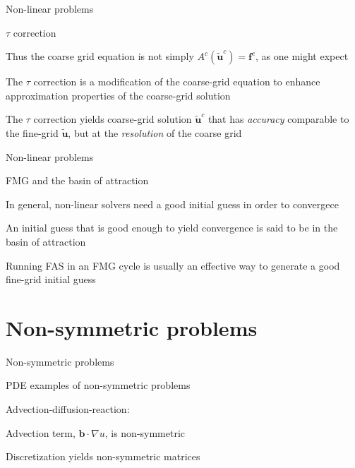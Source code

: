 \documentclass[18pt,xcolor=table]{beamer}
\begin{document}
\begin{frame}{Non-linear problems}
\begin{block}{$\tau$ correction}
\bit
\item Thus the coarse grid equation is not simply $A^c(\mathbf{\tilde{u}}^c) = \mathbf{f}^c$, as one might expect
\item The $\tau$ correction is a modification of the coarse-grid equation to enhance approximation properties of the coarse-grid solution
\item The $\tau$ correction yields coarse-grid solution $\mathbf{\tilde{u}}^c$ that has \emph{accuracy} comparable to the fine-grid $\mathbf{\tilde{u}}$, but at the \emph{resolution} of the coarse grid
\eit
\end{block}
\end{frame}

\begin{frame}{Non-linear problems}
\begin{block}{FMG and the basin of attraction}
\bit
\item In general, non-linear solvers need a good initial guess in order to convergece
\item An initial guess that is good enough to yield convergence is said to be in the basin of attraction
\item Running FAS in an FMG cycle is usually an effective way to generate a good fine-grid initial guess
\eit
\end{block}
\end{frame}


\section{Non-symmetric problems}

\begin{frame}{Non-symmetric problems}
\begin{block}{PDE examples of non-symmetric problems}
\bit
\item Advection-diffusion-reaction:
\item Advection term, $\mathbf{b}\cdot\nabla u$, is non-symmetric
\item Discretization yields non-symmetric matrices
\eit
\end{block}
\end{frame}
\end{document}
